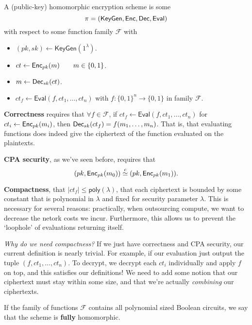 \begin{definition}\label{def:fhe}
    A (public-key) homomorphic encryption scheme is some
    \[\pi = (\mathsf{KeyGen}, \operatorname{\mathsf{Enc}}, \operatorname{\mathsf{Dec}}, \mathsf{Eval})\]
    with respect to some function family $\mathcal{F}$ with
    \begin{itemize}
        \item $(pk, sk)\leftarrow \mathsf{KeyGen}(1^\lambda)$.
        \item $ct\leftarrow \operatorname{\mathsf{Enc}}_{pk}(m)\qquad m\in \{0, 1\}$.
        \item $m\leftarrow \operatorname{\mathsf{Dec}}_{sk}(ct)$.
        \item $ct_f\leftarrow \mathsf{Eval}(f, ct_1, \dots, ct_n)$ with $f : \{0, 1\}^n\to \{0, 1\}$ in family $\mathcal{F}$.
    \end{itemize}

    \textbf{Correctness} requires that $\forall f\in \mathcal{F}$, if $ct_f \leftarrow \mathsf{Eval}(f, ct_1, \dots, ct_n)$ for $ct_i\leftarrow \operatorname{\mathsf{Enc}}_{pk}(m_i)$, then $\operatorname{\mathsf{Dec}}_{sk}(ct_f) = f(m_1, \dots, m_n)$. That is, that evaluating functions does indeed give the ciphertext of the function evaluated on the plaintexts.

    \textbf{CPA security}, as we've seen before, requires that
    \[(pk, \operatorname{\mathsf{Enc}}_{pk}(m_0))\overset{c}{\simeq}(pk, \operatorname{\mathsf{Enc}}_{pk}(m_1)).\]
    
    \textbf{Compactness}, that $|ct_f| \leq \mathsf{poly}(\lambda)$, that each ciphertext is bounded by some constant that is polynomial in $\lambda$ and fixed for security parameter $\lambda$. This is necessary for several reasons: practically, when outsourcing compute, we want to decrease the netork costs we incur. Furthermore, this allows us to prevent the `loophole' of evaluations returning itself.

\end{definition}

\textit{Why do we need compactness?} If we just have correctness and CPA security, our current definition is nearly trivial. For example, if our evaluation just output the tuple $(f, ct_1, \dots, ct_n)$. To decrypt, we decrypt each $ct_i$ individually and apply $f$ on top, and this satisfies our definitions! We need to add some notion that our ciphertext must stay within some size, and that we're actually \emph{combining} our ciphertexts.

If the family of functions $\mathcal{F}$ contains all polynomial sized Boolean circuits, we say that the scheme is \textbf{fully} homomorphic.

